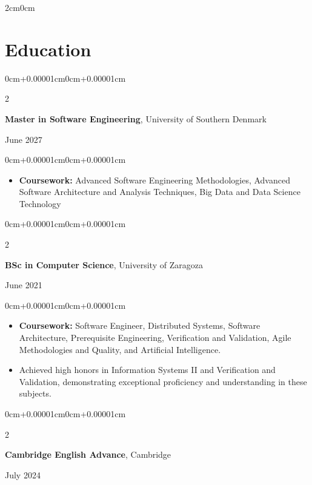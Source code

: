\documentclass[10pt, a4paper]{article}
\newenvironment{highlights}{
    \begin{itemize}[
        topsep=0.08cm, parsep=0.08cm, partopsep=0pt,
        itemsep=0pt, leftmargin=0cm+10pt
    ]
}{
    \end{itemize}
}
\newenvironment{onecolentry}{
    \begin{adjustwidth}{0cm+0.00001cm}{0cm+0.00001cm}
}{
    \end{adjustwidth}
}
\newenvironment{twocolentry}[2][]{
    \onecolentry
    \def\secondColumn{#2}
    \setcolumnwidth{\fill, 4.5cm}
    \begin{paracol}{2}
}{
    \switchcolumn\raggedleft\small\color{mutedText}\secondColumn
    \end{paracol}
    \endonecolentry
}
\begin{document}

\begin{adjustwidth}{2cm}{0cm}

\vspace{0.10cm}
\section{Education}
\begin{twocolentry}{June 2027}
\textbf{Master in Software Engineering}, University of Southern Denmark
\end{twocolentry}

\vspace{0.10 cm}
\begin{onecolentry}
\begin{highlights}
\item \textbf{Coursework:} Advanced Software Engineering Methodologies, Advanced Software Architecture and Analysis Techniques, Big Data and Data Science Technology
\end{highlights}
\end{onecolentry}
\vspace{0.20 cm}
\begin{twocolentry}{June 2021}
\textbf{BSc in Computer Science}, University of Zaragoza
\end{twocolentry}

\vspace{0.10 cm}
\begin{onecolentry}
\begin{highlights}
\item \textbf{Coursework:} Software Engineer, Distributed Systems, Software Architecture, Prerequisite Engineering, Verification and Validation, Agile Methodologies and Quality, and Artificial Intelligence.
\item Achieved high honors in Information Systems II and Verification and Validation, demonstrating exceptional proficiency and understanding in these subjects.
\end{highlights}
\end{onecolentry}
\vspace{0.20 cm}
\begin{twocolentry}{July 2024}
\textbf{Cambridge English  Advance}, Cambridge
\end{twocolentry}




\end{adjustwidth}
\end{document}
